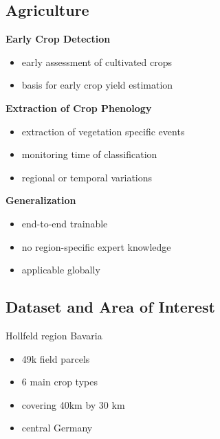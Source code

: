 \documentclass[a0]{tumposter}
\begin{document}
\begin{minipage}[t]{.65\textwidth}
	\begin{minipage}[t]{.5\textwidth}
	\subsection{Agriculture}
	
	\small
	
	\vspace{1em}
	
		\textbf{Early Crop Detection}
		\begin{itemize}
			\item early assessment of cultivated crops
			\item basis for early crop yield estimation
		\end{itemize}
		\vspace{.3em}
		
		\textbf{Extraction of Crop Phenology}
		\begin{itemize}
			\item extraction of vegetation specific events 
			\item monitoring time of classification
			\item regional or temporal variations
		\end{itemize}
		\vspace{.3em}
		
		\textbf{Generalization}
		\begin{itemize}
			\item end-to-end trainable
			\item no region-specific expert knowledge
			\item applicable globally
		\end{itemize}
	
	\end{minipage}
	\begin{minipage}[t]{.49\textwidth}
	\subsection{Dataset and Area of Interest} \par
	\begin{minipage}{.6\textwidth}
		\small
		\vspace{1em}
		Hollfeld region Bavaria
		\begin{itemize}
			\item 49k field parcels
			\item 6 main crop types
			\item covering 40km by 30 km
			\item central Germany
		\end{itemize}
		

\end{minipage}
\end{minipage}
\end{minipage}
\end{document}
